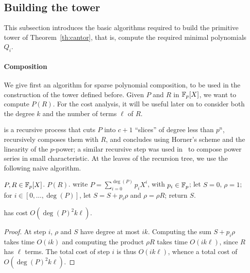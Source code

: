 

\subsection{Building the tower}

This subsection introduces the basic algorithms required to build the
primitive tower of Theorem~\ref{th:cantor}, that is, compute the
required minimal polynomials $Q_i$.

\paragraph{Composition} We give first an algorithm for sparse
polynomial composition, to be used in the construction of the tower
defined before.  Given $P$ and $R$ in $\mathbb{F}_p[X]$, we want to compute
$P(R)$. For the cost analysis, it will be useful later on to consider
both the degree $k$ and the number of terms $\ell$ of $R$.

 is a recursive process that cuts
$P$ into $c+1$ ``slices'' of degree less than $p^n$, recursively
composes them with $R$, and concludes using Horner's scheme and the
linearity of the $p$-power; a similar recursive step was used
in~\cite{bernstein98} to compose power series in small characteristic.
At the leaves of the recursion tree, we use the following naive
algorithm.

\begin{algorithm}
  \caption{}
  \label{alg:naivecompose}
  \begin{algorithmic}[1]
    \REQUIRE $P,R\in\mathbb{F}_p[X]$.
    \ENSURE $P(R)$.
    \STATE write $P=\sum_{i=0}^{\deg(P)} p_i X^{i}$, with $p_i \in \mathbb{F}_p$;
    \STATE let $S=0$, $\rho=1$;
    \STATE for $i\in [0,\dots,\deg(P)]$, let $S=S+p_i \rho$ and $\rho =\rho R$;
    \STATE return $S$.
  \end{algorithmic}
\end{algorithm}

\begin{lemma}
   has cost $O(\deg(P)^2k\ell)$.  
\end{lemma}
\begin{proof} At step $i$, $\rho$ and $S$ have degree at most
$ik$. Computing the sum $S + p_i \rho$ takes time $O(ik)$ and
computing the product $\rho R$ takes time $O(ik\ell)$, since $R$ has
$\ell$ terms. The total cost of step $i$ is thus $O(ik\ell)$, 
whence a total cost of $O(\deg(P)^2 k\ell)$.
\end{proof}


